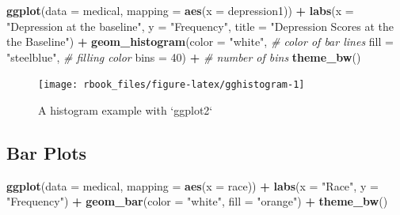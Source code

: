 \documentclass[]{book}
\newenvironment{Shaded}{\begin{snugshade}}{\end{snugshade}}
\newcommand{\CommentTok}[1]{\textcolor[rgb]{0.56,0.35,0.01}{\textit{#1}}}
\newcommand{\DataTypeTok}[1]{\textcolor[rgb]{0.13,0.29,0.53}{#1}}
\newcommand{\DecValTok}[1]{\textcolor[rgb]{0.00,0.00,0.81}{#1}}
\newcommand{\KeywordTok}[1]{\textcolor[rgb]{0.13,0.29,0.53}{\textbf{#1}}}
\newcommand{\NormalTok}[1]{#1}
\newcommand{\OperatorTok}[1]{\textcolor[rgb]{0.81,0.36,0.00}{\textbf{#1}}}
\newcommand{\StringTok}[1]{\textcolor[rgb]{0.31,0.60,0.02}{#1}}
\begin{document}
\begin{Shaded}
\begin{Highlighting}[]
\KeywordTok{ggplot}\NormalTok{(}\DataTypeTok{data =}\NormalTok{ medical, }
       \DataTypeTok{mapping =} \KeywordTok{aes}\NormalTok{(}\DataTypeTok{x =}\NormalTok{ depression1)) }\OperatorTok{+}\StringTok{ }
\StringTok{  }\KeywordTok{labs}\NormalTok{(}\DataTypeTok{x =} \StringTok{"Depression at the baseline"}\NormalTok{,}
       \DataTypeTok{y =} \StringTok{"Frequency"}\NormalTok{,}
       \DataTypeTok{title =} \StringTok{"Depression Scores at the the Baseline"}\NormalTok{) }\OperatorTok{+}\StringTok{ }
\StringTok{  }\KeywordTok{geom_histogram}\NormalTok{(}\DataTypeTok{color =} \StringTok{"white"}\NormalTok{, }\CommentTok{# color of bar lines}
                 \DataTypeTok{fill =} \StringTok{"steelblue"}\NormalTok{, }\CommentTok{# filling color}
                 \DataTypeTok{bins =} \DecValTok{40}\NormalTok{) }\OperatorTok{+}\StringTok{ }\CommentTok{# number of bins}
\StringTok{  }\KeywordTok{theme_bw}\NormalTok{()}
\end{Highlighting}
\end{Shaded}

\begin{figure}

{\centering \texttt{[image: rbook\_files/figure-latex/gghistogram-1]} 

}

\caption{A histogram example with `ggplot2`}\label{fig:gghistogram}
\end{figure}

\hypertarget{bar-plots}{%
\subsection{Bar Plots}\label{bar-plots}}

\begin{Shaded}
\begin{Highlighting}[]
\KeywordTok{ggplot}\NormalTok{(}\DataTypeTok{data =}\NormalTok{ medical, }
       \DataTypeTok{mapping =} \KeywordTok{aes}\NormalTok{(}\DataTypeTok{x =}\NormalTok{ race)) }\OperatorTok{+}\StringTok{ }
\StringTok{  }\KeywordTok{labs}\NormalTok{(}\DataTypeTok{x =} \StringTok{"Race"}\NormalTok{,}
       \DataTypeTok{y =} \StringTok{"Frequency"}\NormalTok{) }\OperatorTok{+}\StringTok{ }
\StringTok{  }\KeywordTok{geom_bar}\NormalTok{(}\DataTypeTok{color =} \StringTok{"white"}\NormalTok{,}
           \DataTypeTok{fill =} \StringTok{"orange"}\NormalTok{) }\OperatorTok{+}
\StringTok{  }\KeywordTok{theme_bw}\NormalTok{()}
\end{Highlighting}
\end{Shaded}
\end{document}
